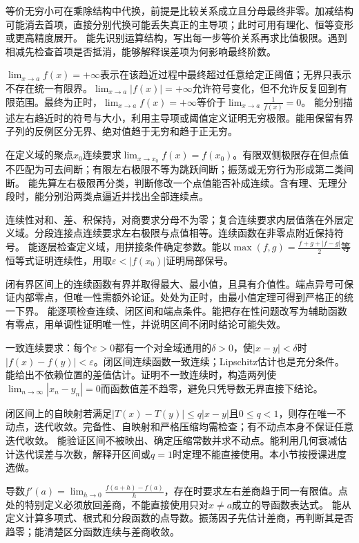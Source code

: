 {等价无穷小可在乘除结构中代换，前提是比较关系成立且分母最终非零。加减结构可能消去首项，直接分别代换可能丢失真正的主导项；此时可用有理化、恒等变形或更高精度展开。}
{能先识别运算结构，写出每一步等价关系再求比值极限。遇到相减先检查首项是否抵消，能够解释误差项为何影响最终阶数。}

{$\lim_{x\to a}f(x)=+\infty$表示在该趋近过程中最终超过任意给定正阈值；无界只表示不存在统一有限界。$\lim_{x\to a}|f(x)|=+\infty$允许符号变化，但不允许反复回到有限范围。最终为正时，$\lim_{x\to a}f(x)=+\infty$等价于$\lim_{x\to a}\frac{1}{f(x)}=0$。}
{能分别描述左右趋近时的符号与大小，利用主导项或阈值定义证明无穷极限。能用保留有界子列的反例区分无界、绝对值趋于无穷和趋于正无穷。}

{在定义域的聚点$x_0$连续要求$\lim_{x\to x_0}f(x)=f(x_0)$。有限双侧极限存在但点值不匹配为可去间断；有限左右极限不等为跳跃间断；振荡或无穷行为形成第二类间断。}
{能先算左右极限再分类，判断修改一个点值能否补成连续。含有理、无理分段时，能分别沿两类点逼近并找出全部连续点。}

{连续性对和、差、积保持，对商要求分母不为零；复合连续要求内层值落在外层定义域。分段连接点连续要求左右极限与点值相等。连续函数在非零点附近保持符号。}
{能逐层检查定义域，用拼接条件确定参数。能以$\max(f,g)=\frac{f+g+|f-g|}{2}$等恒等式证明连续性，用取$\varepsilon<|f(x_0)|$证明局部保号。}

{闭有界区间上的连续函数有界并取得最大、最小值，且具有介值性。端点异号可保证内部零点，但唯一性需额外论证。处处为正时，由最小值定理可得到严格正的统一下界。}
{能逐项检查连续、闭区间和端点条件。能把存在性问题改写为辅助函数有零点，用单调性证明唯一性，并说明区间不闭时结论可能失效。}

{一致连续要求：每个$\varepsilon>0$都有一个对全域通用的$\delta>0$，使$|x-y|<\delta$时$|f(x)-f(y)|<\varepsilon$。闭区间连续函数一致连续；Lipschitz估计也是充分条件。}
{能给出不依赖位置的差值估计。证明不一致连续时，构造两列使$\lim_{n\to\infty}|x_n-y_n|=0$而函数值差不趋零，避免只凭导数无界直接下结论。}

{闭区间上的自映射若满足$|T(x)-T(y)|\le q|x-y|$且$0\le q<1$，则存在唯一不动点，迭代收敛。完备性、自映射和严格压缩均需检查；有不动点本身不保证任意迭代收敛。}
{能验证区间不被映出、确定压缩常数并求不动点。能利用几何衰减估计迭代误差与次数，解释开区间或$q=1$时定理不能直接使用。本小节按授课进度选做。}

{导数$f'(a)=\lim_{h\to0}\frac{f(a+h)-f(a)}{h}$，存在时要求左右差商趋于同一有限值。点处的特别定义必须放回差商，不能直接使用只对$x\ne a$成立的导函数表达式。}
{能从定义计算多项式、根式和分段函数的点导数。振荡因子先估计差商，再判断其是否趋零；能清楚区分函数连续与差商收敛。}

